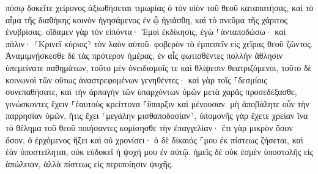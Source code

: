 \documentclass[twoside, 9pt]{extreport}
\begin{document}
πόσῳ δοκεῖτε χείρονος ἀξιωθήσεται τιμωρίας ὁ τὸν υἱὸν τοῦ θεοῦ καταπατήσας, καὶ τὸ αἷμα τῆς διαθήκης κοινὸν ἡγησάμενος ἐν ᾧ ἡγιάσθη, καὶ τὸ πνεῦμα τῆς χάριτος ἐνυβρίσας. 
οἴδαμεν γὰρ τὸν εἰπόντα· Ἐμοὶ ἐκδίκησις, ἐγὼ ⸀ἀνταποδώσω· καὶ πάλιν· ⸂Κρινεῖ κύριος⸃ τὸν λαὸν αὐτοῦ. 
φοβερὸν τὸ ἐμπεσεῖν εἰς χεῖρας θεοῦ ζῶντος. 
Ἀναμιμνῄσκεσθε δὲ τὰς πρότερον ἡμέρας, ἐν αἷς φωτισθέντες πολλὴν ἄθλησιν ὑπεμείνατε παθημάτων, 
τοῦτο μὲν ὀνειδισμοῖς τε καὶ θλίψεσιν θεατριζόμενοι, τοῦτο δὲ κοινωνοὶ τῶν οὕτως ἀναστρεφομένων γενηθέντες· 
καὶ γὰρ τοῖς ⸀δεσμίοις συνεπαθήσατε, καὶ τὴν ἁρπαγὴν τῶν ὑπαρχόντων ὑμῶν μετὰ χαρᾶς προσεδέξασθε, γινώσκοντες ἔχειν ⸀ἑαυτοὺς κρείττονα ⸀ὕπαρξιν καὶ μένουσαν. 
μὴ ἀποβάλητε οὖν τὴν παρρησίαν ὑμῶν, ἥτις ἔχει ⸂μεγάλην μισθαποδοσίαν⸃, 
ὑπομονῆς γὰρ ἔχετε χρείαν ἵνα τὸ θέλημα τοῦ θεοῦ ποιήσαντες κομίσησθε τὴν ἐπαγγελίαν· 
ἔτι γὰρ μικρὸν ὅσον ὅσον, ὁ ἐρχόμενος ἥξει καὶ οὐ χρονίσει· 
ὁ δὲ δίκαιός ⸀μου ἐκ πίστεως ζήσεται, καὶ ἐὰν ὑποστείληται, οὐκ εὐδοκεῖ ἡ ψυχή μου ἐν αὐτῷ. 
ἡμεῖς δὲ οὐκ ἐσμὲν ὑποστολῆς εἰς ἀπώλειαν, ἀλλὰ πίστεως εἰς περιποίησιν ψυχῆς. 
\end{document}
